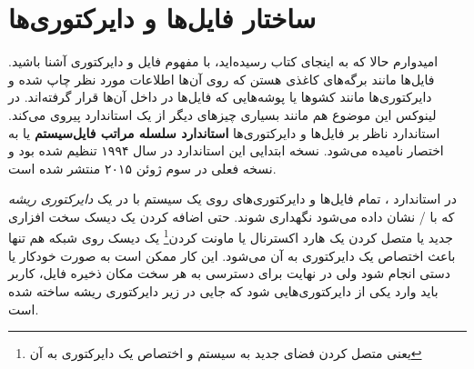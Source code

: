 \section{ساختار فایل‌ها و دایرکتوری‌ها}
امیدوارم حالا که به اینجای کتاب رسیده‌اید، با مفهوم فایل و دایرکتوری آشنا باشید. فایل‌ها مانند برگه‌های کاغذی هستن که روی آن‌ها اطلاعات مورد نظر چاپ شده و دایرکتوری‌ها مانند کشوها یا پوشه‌هایی که فایل‌ها در داخل آن‌ها قرار گرفته‌اند. در لینوکس این موضوع هم مانند بسیاری چیزهای دیگر از یک استاندارد پیروی می‌کند. استاندارد ناظر بر فایل‌ها و دایرکتوری‌ها
\textbf{استاندارد سلسله مراتب فایل‌سیستم}
یا به اختصار 
 نامیده می‌شود. نسخه ابتدایی این استاندارد در سال ۱۹۹۴ تنظیم شده بود و نسخه فعلی در سوم ژوئن ۲۰۱۵ منتشر شده است.

در استاندارد 
، تمام فایل‌ها و دایرکتوری‌های روی یک سیستم با در یک
\emph{دایرکتوری ریشه}
که با / نشان داده می‌شود نگهداری شوند. حتی اضافه کردن یک دیسک سخت افزاری جدید یا متصل کردن یک هارد اکسترنال یا
ماونت کردن\footnote{یعنی متصل کردن فضای جدید به سیستم و اختصاص یک دایرکتوری به آن}
یک دیسک روی شبکه هم تنها باعث اختصاص یک دایرکتوری به آن می‌شود. این کار ممکن است به صورت خودکار یا دستی انجام شود ولی در نهایت برای دسترسی به هر سخت مکان ذخیره فایل، کاربر باید وارد یکی از دایرکتوری‌هایی شود که جایی در زیر دایرکتوری ریشه ساخته شده است.

